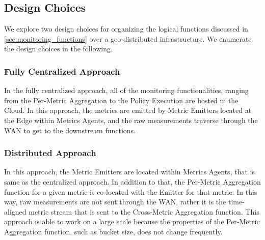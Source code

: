 \subsection{Design Choices}
We explore two design choices for organizing the logical functions discussed in \cref{sec:monitoring_functions} over a geo-distributed infrastructure. We enumerate the design choices in the following.

\subsubsection{Fully Centralized Approach}
In the fully centralized approach, all of the monitoring functionalities, ranging from the Per-Metric Aggregation to the Policy Execution are hosted in the Cloud. In this approach, the metrics are emitted by Metric Emitters located at the Edge within Metrics Agents, and the raw measurements traverse through the WAN to get to the downstream functions. 

\subsubsection{Distributed Approach}
In this approach, the Metric Emitters are located within Metrics Agents, that is same as the centralized approach. In addition to that, the Per-Metric Aggregation function for a given metric is co-located with the Emitter for that metric. In this way, raw measurements are not sent through the WAN, rather it is the time-aligned metric stream that is sent to the Cross-Metric Aggregation function. This approach is able to work on a large scale because the properties of the Per-Metric Aggregation function, such as bucket size, does not change frequently.

